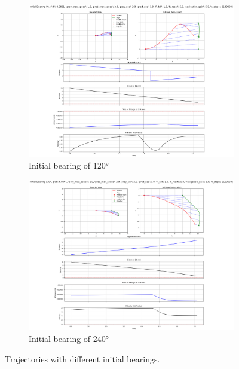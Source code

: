 \documentclass[11pt, twocolumn]{article}
\begin{document}
        \begin{figure}[H]
          \centering
          \begin{subfigure}[b]{0.48\textwidth}
            \centering
            \includegraphics[width=\textwidth]{figures/initial_bearing_120.png}
            \caption{Initial bearing of 120°}
            \label{fig:bear120}
          \end{subfigure}
          \hfill
          \begin{subfigure}[b]{0.48\textwidth}
            \centering
            \includegraphics[width=\textwidth]{figures/initial_bearing_240.png}
            \caption{Initial bearing of 240°}
            \label{fig:bear240}
          \end{subfigure}
          \caption{Trajectories with different initial bearings.}
          \label{fig:trajectories}
        \end{figure}
\end{document}
